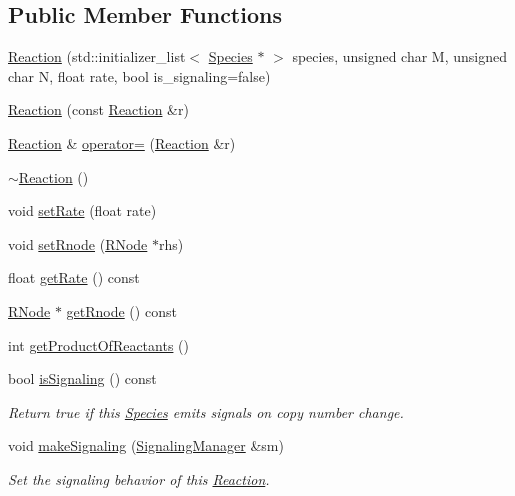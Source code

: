 \subsection*{Public Member Functions}
\begin{DoxyCompactItemize}
\item 
\hyperlink{classReaction_ab939d7eea3ca4e9b707cc7b8385ac8c0}{Reaction} (std\-::initializer\-\_\-list$<$ \hyperlink{classSpecies}{Species} $\ast$ $>$ species, unsigned char M, unsigned char N, float rate, bool is\-\_\-signaling=false)
\item 
\hyperlink{classReaction_ac409bbbb72a0464c7be007f55c4e5582}{Reaction} (const \hyperlink{classReaction}{Reaction} \&r)
\item 
\hyperlink{classReaction}{Reaction} \& \hyperlink{classReaction_a966aec8f7608562e1d595dfde2d2e15b}{operator=} (\hyperlink{classReaction}{Reaction} \&r)
\item 
\hyperlink{classReaction_a5aad8265f83d20139ae7159ed5e35bf7}{$\sim$\-Reaction} ()
\item 
void \hyperlink{classReaction_a6be6ae57ea51ca29c935b8ac2a363d19}{set\-Rate} (float rate)
\item 
void \hyperlink{classReaction_a034f5132dbe9c759d03c56621d23b896}{set\-Rnode} (\hyperlink{classRNode}{R\-Node} $\ast$rhs)
\item 
float \hyperlink{classReaction_a5475cfe1f3d0b491494dd22e2c2dcd9c}{get\-Rate} () const 
\item 
\hyperlink{classRNode}{R\-Node} $\ast$ \hyperlink{classReaction_aa5ec849dfa3f46111f4dd37be9e3f9df}{get\-Rnode} () const 
\item 
int \hyperlink{classReaction_aba49f1962862dd8d252eeed14e8e8f39}{get\-Product\-Of\-Reactants} ()
\item 
bool \hyperlink{classReaction_a98bace753ccc6464b85a451ddc988ce5}{is\-Signaling} () const 
\begin{DoxyCompactList}\small\item\em Return true if this \hyperlink{classSpecies}{Species} emits signals on copy number change. \end{DoxyCompactList}\item 
void \hyperlink{classReaction_ad08cc347d77e7e5c7f816240d96f9256}{make\-Signaling} (\hyperlink{classSignalingManager}{Signaling\-Manager} \&sm)
\begin{DoxyCompactList}\small\item\em Set the signaling behavior of this \hyperlink{classReaction}{Reaction}. \end{DoxyCompactList}\item 

\end{DoxyCompactItemize}
